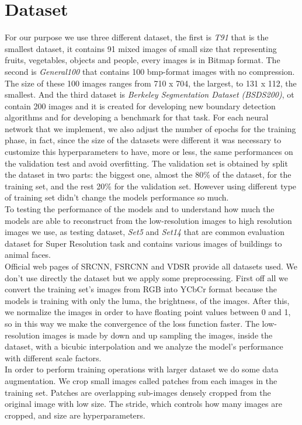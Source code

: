 \documentclass[10pt,twocolumn,letterpaper]{article}
\begin{document}
\section{Dataset}
For our purpose we use three different dataset, the first is \textit{T91} that is the smallest dataset, it contains 91 mixed images of small size that representing fruits, vegetables, objects and people, every images is in Bitmap format. The second is \textit{General100} that contains 100 bmp-format images with no compression. The size of these 100 images ranges from 710 x 704, the largest, to 131 x 112, the smallest. And the third dataset is \textit{Berkeley Segmentation Dataset (BSDS200)}, ot contain 200 images and it is created for developing new boundary detection algorithms and for developing a benchmark for that task. For each neural network that we implement, we also adjust the number of epochs for the training phase, in fact, since the size of the datasets were different it was necessary to customize this hyperparameters to have, more or less, the same performances on the validation test and avoid overfitting. The validation set is obtained by split the dataset in two parts: the biggest one, almost the 80\% of the dataset, for the training set, and the rest 20\% for the validation set. However using different type of training set didn't change the models performance so much.\\
To testing the performance of the models and to understand how much the models are able to reconstruct from the low-resolution images to high resolution images we use, as testing dataset, \textit{Set5} and \textit{Set14} that are common evaluation dataset  for Super Resolution task and contains various images of buildings to animal faces.\\
Official web pages of SRCNN, FSRCNN and VDSR provide all datasets used.
We don’t use directly the dataset but we apply some preprocessing. First off all we convert the training set’s images from RGB into YCbCr format because the models is training with only the luma, the brightness, of the images. After this, we normalize the images in order to have floating point values between 0 and 1, so in this way we make the convergence of the loss function faster. The low-resolution images is made by down and up sampling the images, inside the dataset, with a bicubic interpolation and we analyze the model’s performance with different scale factors.\\
In order to perform training operations with larger dataset we do some data augmentation. 
We crop small images called patches from each images in the training set. Patches are overlapping sub-images densely cropped from the original image with low size. The stride, which controls how many images are cropped, and size are hyperparameters.\\
\end{document}

